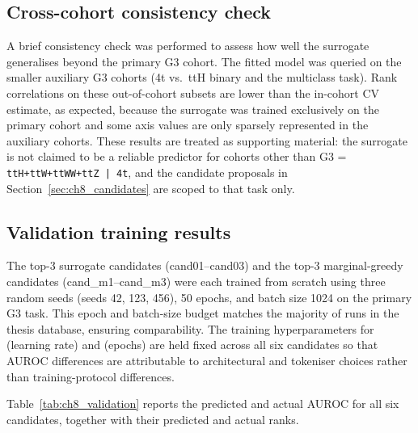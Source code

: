 \subsection{Cross-cohort consistency check}
\label{sec:ch8_crosscohort}

A brief consistency check was performed to assess how well the surrogate
generalises beyond the primary G3 cohort. The fitted model was queried on the
smaller auxiliary G3 cohorts (4t vs.\ ttH binary and the multiclass task). Rank
correlations on these out-of-cohort subsets are lower than the in-cohort CV
estimate, as expected, because the surrogate was trained exclusively on the
primary cohort and some axis values are only sparsely represented in the
auxiliary cohorts. These results are treated as supporting material: the
surrogate is not claimed to be a reliable predictor for cohorts other than
G3 = \texttt{ttH+ttW+ttWW+ttZ | 4t}, and the candidate proposals in
Section~\ref{sec:ch8_candidates} are scoped to that task only.

\subsection{Validation training results}
\label{sec:ch8_validation}

The top-3 surrogate candidates (cand01--cand03) and the top-3 marginal-greedy
candidates (cand\_m1--cand\_m3) were each trained from scratch using three
random seeds (seeds 42, 123, 456), 50 epochs, and batch size 1024 on the
primary G3 task. This epoch and batch-size budget matches the majority of runs
in the thesis database, ensuring comparability. The training hyperparameters for
 (learning rate) and  (epochs) are held fixed across
all six candidates so that AUROC differences are attributable to architectural
and tokeniser choices rather than training-protocol differences.

Table~\ref{tab:ch8_validation} reports the predicted and actual AUROC for all
six candidates, together with their predicted and actual ranks.

